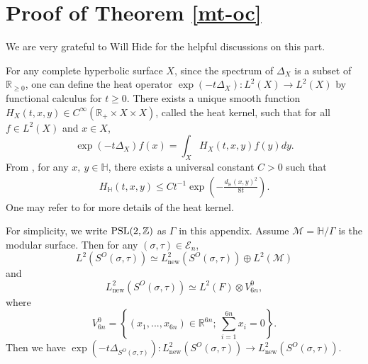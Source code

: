 \documentclass{amsart}
\theoremstyle{plain}
\theoremstyle{definition}
\theoremstyle{remark}
\begin{document}
\section{Proof of Theorem \ref{mt-oc}}
We are very grateful to Will Hide for the helpful discussions on this part.

For any complete hyperbolic surface $X$, since the spectrum of $\Delta_X$ is a subset of $\mathbb{R}_{\geq 0}$, one can define the heat operator $\exp(-t\Delta_X):L^2(X)\to L^2(X)$ by functional calculus for $t\geq 0$. There exists a unique smooth function $H_X(t,x,y)\in C^\infty(\mathbb{R}_+\times X\times X)$, called the heat kernel, such that for all $f\in L^2(X)$ and $x\in X$,
$$\exp(-t\Delta_X)f(x)=\int_X H_X(t,x,y)f(y)dy.$$
From \cite[Lemma 7.4.26]{Bu-book}, for any $x,\ y\in\mathbb{H}$, there exists a universal constant $C>0$ such that
\begin{equation}
\begin{aligned}\label{heat-est}
    H_{\mathbb{H}}(t,x,y)\leq Ct^{-1}\exp\left(-\frac{d_{\mathbb{H}}(x,y)^2}{8t}\right).
\end{aligned}
\end{equation}
One may refer to \cite[Chapter 7]{Bu-book} for more details of the heat kernel.

For simplicity, we write $\textnormal{PSL}(2,\mathbb{Z})$ as $\Gamma$ in this appendix. Assume $\mathcal{M}=\mathbb{H}/\Gamma$ is the modular surface. Then for any $(\sigma,\tau)\in\mathcal{E}_n$,
$$L^2(S^O(\sigma,\tau))\simeq L^2_{\text{new}}(S^O(\sigma,\tau))\oplus L^2(\mathcal{M})$$
and
$$L^2_{\text{new}}(S^O(\sigma,\tau))\simeq L^2(F)\otimes V_{6n}^0,$$
where 
$$V_{6n}^0=\left\{(x_1,...,x_{6n})\in\mathbb{R}^{6n};\ \sum\limits_{i=1}^{6n}x_i=0\right\}.$$
Then we have $\exp\left(-t\Delta_{S^O(\sigma,\tau)}\right):L^2_{\text{new}}(S^O(\sigma,\tau))\to L^2_{\text{new}}(S^O(\sigma,\tau))$. 
\end{document}
